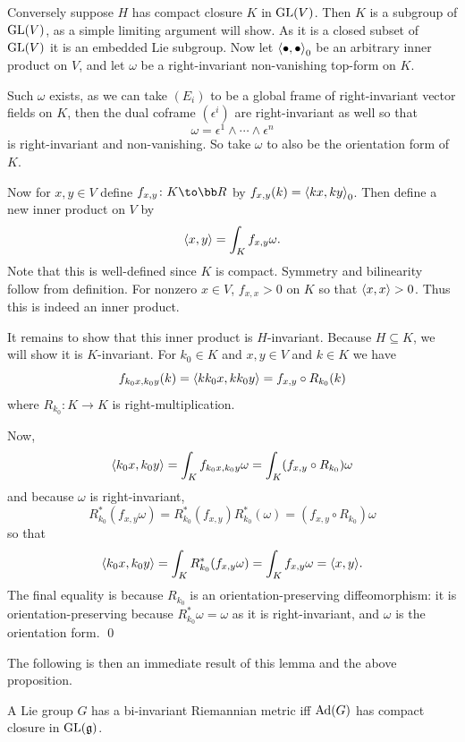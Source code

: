     Conversely suppose $H$ has compact closure $K$ in ${\rm GL}(V)$.
    Then $K$ is a subgroup of ${\rm GL}(V)$, as a simple limiting argument will show.
    As it is a closed subset of ${\rm GL}(V)$ it is an embedded Lie subgroup.
    Now let $\mathopen{}\mathclose{\left<\bullet,\bullet\right>}_0$ be an arbitrary inner product on $V$, and let $\omega$ be a right-invariant
    non-vanishing top-form on $K$.

    Such $\omega$ exists, as we can take $(E_i)$ to be a global frame of right-invariant vector fields on $K$, then
    the dual coframe $(\epsilon^i)$ are right-invariant as well so that
    $$ \omega = \epsilon^1\wedge\cdots\wedge\epsilon^n $$
    is right-invariant and non-vanishing.
    So take $\omega$ to also be the orientation form of $K$.

    Now for $x,y\in V$ define $f_{x,y}\colon K\to\bR$ by $f_{x,y}(k)=\mathopen{}\mathclose{\left<kx,ky\right>}_0$.
    Then define a new inner product on $V$ by
    $$ \mathopen{}\mathclose{\left<x,y\right>} = \int_Kf_{x,y}\omega . $$
    Note that this is well-defined since $K$ is compact.
    Symmetry and bilinearity follow from definition.
    For nonzero $x\in V$, $f_{x,x}>0$ on $K$ so that $\mathopen{}\mathclose{\left<x,x\right>}>0$.
    Thus this is indeed an inner product.

    It remains to show that this inner product is $H$-invariant.
    Because $H\subseteq K$, we will show it is $K$-invariant.
    For $k_0\in K$ and $x,y\in V$ and $k\in K$ we have
    $$ f_{k_0x,k_0y}(k) = \mathopen{}\mathclose{\left<kk_0x,kk_0y\right>} = f_{x,y}\circ R_{k_0}(k) $$
    where $R_{k_0}\colon K\to K$ is right-multiplication.

    Now,
    $$ \mathopen{}\mathclose{\left<k_0x,k_0y\right>} = \int_Kf_{k_0x,k_0y}\omega = \int_K(f_{x,y}\circ R_{k_0})\omega $$
    and because $\omega$ is right-invariant,
    $$ R^*_{k_0}(f_{x,y}\omega) = R^*_{k_0}(f_{x,y})R^*_{k_0}(\omega) = (f_{x,y}\circ R_{k_0})\omega $$
    so that
    $$ \mathopen{}\mathclose{\left<k_0x,k_0y\right>} = \int_KR_{k_0}^*(f_{x,y}\omega) = \int_Kf_{x,y}\omega = \mathopen{}\mathclose{\left<x,y\right>} . $$
    The final equality is because $R_{k_0}$ is an orientation-preserving diffeomorphism: it is orientation-preserving because
    $R_{k_0}^*\omega=\omega$ as it is right-invariant, and $\omega$ is the orientation form.
    \qed

\eproof

The following is then an immediate result of this lemma and the above proposition.

\bthrm

    A Lie group $G$ has a bi-invariant Riemannian metric iff ${\rm Ad}(G)$ has compact closure in ${\rm GL}({{\frak g}})$.

\ethrm


